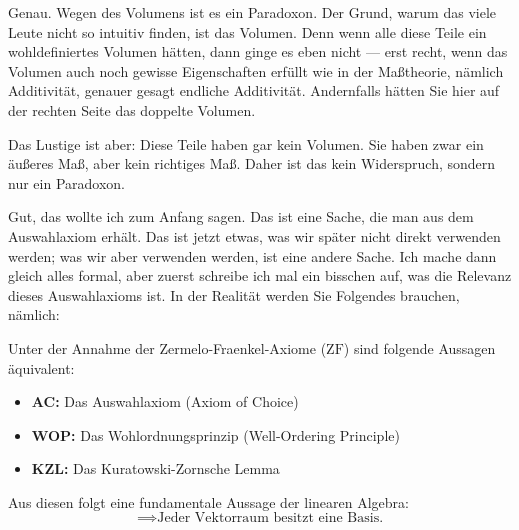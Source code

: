 \begin{spoken-clean}[00:06:50 - 00:09:45]
Genau. Wegen des Volumens ist es ein Paradoxon. Der Grund, warum das viele Leute nicht so intuitiv finden, ist das Volumen. Denn wenn alle diese Teile ein wohldefiniertes Volumen hätten, dann ginge es eben nicht --- erst recht, wenn das Volumen auch noch gewisse Eigenschaften erfüllt wie in der Maßtheorie, nämlich Additivität, genauer gesagt endliche Additivität. Andernfalls hätten Sie hier auf der rechten Seite das doppelte Volumen.

Das Lustige ist aber: Diese Teile haben gar kein Volumen. Sie haben zwar ein äußeres Maß, aber kein richtiges Maß. Daher ist das kein Widerspruch, sondern nur ein Paradoxon.

Gut, das wollte ich zum Anfang sagen. Das ist eine Sache, die man aus dem Auswahlaxiom erhält. Das ist jetzt etwas, was wir später nicht direkt verwenden werden; was wir aber verwenden werden, ist eine andere Sache. Ich mache dann gleich alles formal, aber zuerst schreibe ich mal ein bisschen auf, was die Relevanz dieses Auswahlaxioms ist. In der Realität werden Sie Folgendes brauchen, nämlich:
\end{spoken-clean}

\begin{math-stroke}
Unter der Annahme der Zermelo-Fraenkel-Axiome ($\text{ZF}$) sind folgende Aussagen äquivalent:
\begin{itemize}
    \item \textbf{AC:} Das Auswahlaxiom (Axiom of Choice)
    \item \textbf{WOP:} Das Wohlordnungsprinzip (Well-Ordering Principle)
    \item \textbf{KZL:} Das Kuratowski-Zornsche Lemma
\end{itemize}
Aus diesen folgt eine fundamentale Aussage der linearen Algebra:
\[
\implies \text{Jeder Vektorraum besitzt eine Basis.}
\]
\end{math-stroke}

